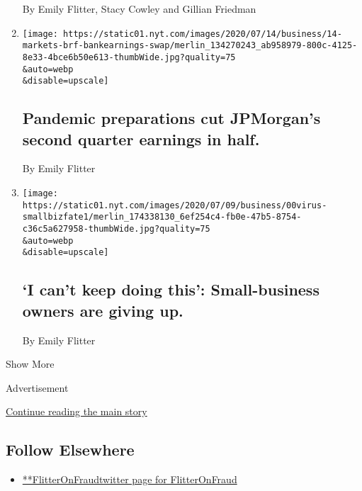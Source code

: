 \begin{enumerate}
  By Emily Flitter, Stacy Cowley and Gillian Friedman
\item
  \href{/2020/07/14/business/pandemic-preparations-cut-jpmorgans-second-quarter-earnings-in-half.html}{}

  \texttt{[image: https://static01.nyt.com/images/2020/07/14/business/14-markets-brf-bankearnings-swap/merlin\_134270243\_ab958979-800c-4125-8e33-4bce6b50e613-thumbWide.jpg?quality=75\\\&auto=webp\\\&disable=upscale]}

  \hypertarget{pandemic-preparations-cut-jpmorgans-second-quarter-earnings-in-half}{%
  \subsection{Pandemic preparations cut JPMorgan's second quarter
  earnings in
  half.}\label{pandemic-preparations-cut-jpmorgans-second-quarter-earnings-in-half}}

  By Emily Flitter
\item
  \href{/2020/07/14/business/i-cant-keep-doing-this-small-business-owners-are-giving-up.html}{}

  \texttt{[image: https://static01.nyt.com/images/2020/07/09/business/00virus-smallbizfate1/merlin\_174338130\_6ef254c4-fb0e-47b5-8754-c36c5a627958-thumbWide.jpg?quality=75\\\&auto=webp\\\&disable=upscale]}

  \hypertarget{i-cant-keep-doing-this-small-business-owners-are-giving-up}{%
  \subsection{`I can't keep doing this': Small-business owners are
  giving
  up.}\label{i-cant-keep-doing-this-small-business-owners-are-giving-up}}

  By Emily Flitter
\end{enumerate}

Show More

Advertisement

\protect\hyperlink{after-mid2}{Continue reading the main story}

\hypertarget{follow-elsewhere}{%
\subsection{Follow Elsewhere}\label{follow-elsewhere}}

\begin{itemize}
\tightlist
\item
  \href{https://twitter.com/FlitterOnFraud}{**FlitterOnFraudtwitter page
  for FlitterOnFraud}
\end{itemize}

